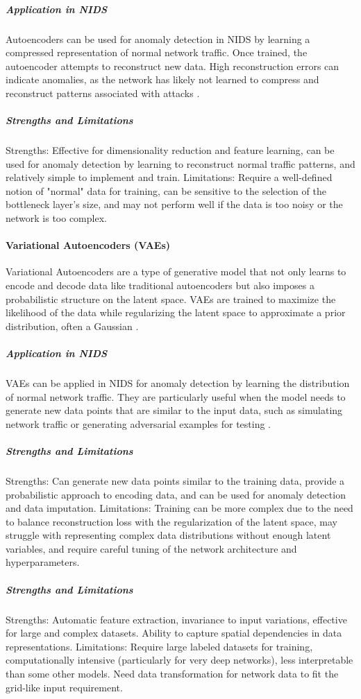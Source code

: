 \subparagraph{Application in NIDS} 
Autoencoders can be used for anomaly detection in NIDS by learning a compressed representation of normal network traffic. Once trained, the autoencoder attempts to reconstruct new data. High reconstruction errors can indicate anomalies, as the network has likely not learned to compress and reconstruct patterns associated with attacks \parencite {zou2021survey}.

\subparagraph{Strengths and Limitations} 
Strengths: Effective for dimensionality reduction and feature learning, can be used for anomaly detection by learning to reconstruct normal traffic patterns, and relatively simple to implement and train.
Limitations: Require a well-defined notion of "normal" data for training, can be sensitive to the selection of the bottleneck layer's size, and may not perform well if the data is too noisy or the network is too complex.

\paragraph{Variational Autoencoders (VAEs)} 
Variational Autoencoders are a type of generative model that not only learns to encode and decode data like traditional autoencoders but also imposes a probabilistic structure on the latent space. VAEs are trained to maximize the likelihood of the data while regularizing the latent space to approximate a prior distribution, often a Gaussian \parencite {al2020survey}.

\subparagraph{Application in NIDS} 
VAEs can be applied in NIDS for anomaly detection by learning the distribution of normal network traffic. They are particularly useful when the model needs to generate new data points that are similar to the input data, such as simulating network traffic or generating adversarial examples for testing \parencite {al2020survey}.

\subparagraph{Strengths and Limitations} 
Strengths: Can generate new data points similar to the training data, provide a probabilistic approach to encoding data, and can be used for anomaly detection and data imputation.
Limitations: Training can be more complex due to the need to balance reconstruction loss with the regularization of the latent space, may struggle with representing complex data distributions without enough latent variables, and require careful tuning of the network architecture and hyperparameters.

\subparagraph{Strengths and Limitations} 
Strengths: Automatic feature extraction, invariance to input variations, effective for large and complex datasets. Ability to capture spatial dependencies in data representations.
Limitations: Require large labeled datasets for training, computationally intensive (particularly for very deep networks), less interpretable than some other models. Need data transformation for network data to fit the grid-like input requirement.

